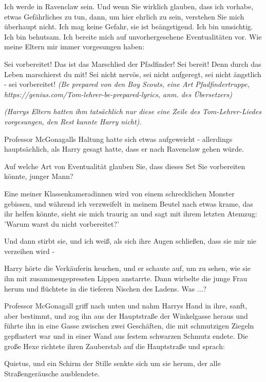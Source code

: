 \glqq{}Ich werde in Ravenclaw sein. Und wenn Sie wirklich glauben, dass ich
vorhabe, etwas Gefährliches zu tun, dann, um hier ehrlich zu sein, verstehen Sie
mich überhaupt nicht. Ich mag keine Gefahr, sie ist beängstigend. Ich bin
umsichtig. Ich bin behutsam. Ich bereite mich auf unvorhergesehene
Eventualitäten vor. Wie meine Eltern mir immer vorgesungen haben:

Sei vorbereitet! Das ist das Marschlied der Pfadfinder! Sei bereit! Denn durch
das Leben marschierst du mit! Sei nicht nervös, sei nicht aufgeregt, sei nicht
ängstlich - sei vorbereitet!\grqq{} \emph{(\glqq{}Be prepared\grqq{} von den
\glqq{}Boy Scouts\grqq{}, eine Art Pfadfindertruppe,
}\emph{https://genius.com/Tom-lehrer-be-prepared-lyrics}\emph{, anm. des
Übersetzers)}

\emph{(Harrys Eltern hatten ihm tatsächlich nur diese eine Zeile des
Tom-Lehrer-Liedes vorgesungen, den Rest kannte Harry nicht).}

Professor McGonagalls Haltung hatte sich etwas aufgeweicht - allerdings
hauptsächlich, als Harry gesagt hatte, dass er nach Ravenclaw gehen würde.

\glqq{}Auf welche Art von Eventualität glauben Sie, dass dieses Set Sie
vorbereiten könnte, junger Mann?\grqq{}

\glqq{}Eine meiner Klassenkameradinnen wird von einem schrecklichen Monster
gebissen, und während ich verzweifelt in meinem Beutel nach etwas krame, das ihr
helfen könnte, sieht sie mich traurig an und sagt mit ihrem letzten Atemzug:
'Warum warst du nicht vorbereitet?'

Und dann stirbt sie, und ich weiß, als sich ihre Augen schließen, dass sie mir
nie verzeihen wird -\grqq{}

Harry hörte die Verkäuferin keuchen, und er schaute auf, um zu sehen, wie sie
ihn mit zusammengepressten Lippen anstarrte. Dann wirbelte die junge Frau herum
und flüchtete in die tieferen Nischen des Ladens. Was ...?

Professor McGonagall griff nach unten und nahm Harrys Hand in ihre, sanft, aber
bestimmt, und zog ihn aus der Hauptstraße der Winkelgasse heraus und führte ihn
in eine Gasse zwischen zwei Geschäften, die mit schmutzigen Ziegeln gepflastert
war und in einer Wand aus festem schwarzen Schmutz endete. Die große Hexe
richtete ihren Zauberstab auf die Hauptstraße und sprach:

\glqq{}Quietus\grqq{}, und ein Schirm der Stille senkte sich um sie herum, der
alle Straßengeräusche ausblendete.

